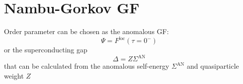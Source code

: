 \section{Nambu-Gorkov GF}

Order parameter can be chosen as the anomalous GF:
\begin{equation}
    \Psi = F^{\mathrm{loc}} (\tau = 0^-)
\end{equation}
or the superconducting gap
\begin{equation}
    \Delta = Z \Sigma^{\mathrm{AN}}
\end{equation}
that can be calculated from the anomalous self-energy \(\Sigma^{\mathrm{AN}}\) and quasiparticle weight \(Z\)


